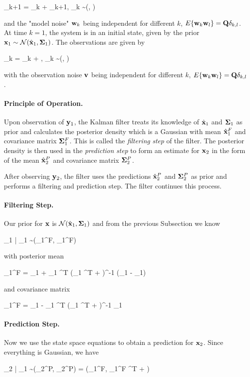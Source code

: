 \bee
\xbf_{k+1} = \Abf \xbf_k + \wbf_{k+1}, \quad \wbf_k \sim \Nc(\zerobf, \Qbf)
\eee

and the "model noise" $\mathbf{w}_k$ being independent for different $k$, $E\{\mathbf{w}_k \mathbf{w}_l\} = \mathbf{Q} \delta_{k,l}$. At time $k=1$, the system is in an initial state, given by the prior $\mathbf{x}_1 \sim \mathcal{N}(\hat {\mathbf{x}}_1, \mathbf{\Sigma}_1)$. The observations are given by

\bee
\ybf_k = \Gbf \xbf_k + \vbf, \quad \vbf_k \sim \Nc(\zerobf, \Rbf)
\eee

with the observation noise $\mathbf{v}$ being independent for different $k$, $E\{\mathbf{w}_k \mathbf{w}_l\} = \mathbf{Q} \delta_{k,l}$.

\paragraph{Principle of Operation.} Upon observation of $\mathbf{y}_1$, the Kalman filter treats its knowledge of $\hat {\mathbf{x}}_1$ and $\mathbf{\Sigma}_1$ as prior and calculates the posterior density which is a Gaussian with mean $\hat{\mathbf{x}}_1^F$ and covariance matrix $\mathbf{\Sigma}_1^F$. This is called the \emph{filtering step} of the filter. The posterior density is then used in the \emph{prediction step} to form an estimate for $\mathbf{x}_2$ in the form of the mean $\hat{\mathbf{x}}_2^P$ and covariance matrix $\mathbf{\Sigma}_2^P$.

After observing $\mathbf{y}_2$, the filter uses the predictions $\hat{\mathbf{x}}_2^P$ and $\mathbf{\Sigma}_2^P$ as prior and performs a filtering and prediction step. The filter continues this process.

\paragraph{Filtering Step.} Our prior for $\mathbf{x}$ is $\mathcal{N}(\hat{\mathbf{x}}_1, \mathbf{\Sigma}_1)$ and from the previous Subsection we know

\bee
\xbf_1 | \ybf_1 \sim \Nc(\xbf_1^F, \Sigmabf_1^F)
\eee

with posterior mean

\bee
\xbf_1^F = \hat\xbf_1 + \Sigmabf_1 \Gbf^T (\Gbf \Sigmabf_1 \Gbf^T + \Rbf)^{-1} (\ybf_1 - \Gbf \hat\xbf_1)
\eee

and covariance matrix

\bee
\Sigmabf_1^F = \Sigmabf_1 - \Sigmabf_1 \Gbf^T (\Gbf \Sigmabf_1 \Gbf^T + \Rbf)^{-1} \Gbf \Sigmabf_1
\eee

\paragraph{Prediction Step.} Now we use the state space equations to obtain a prediction for $\mathbf{x}_2$. Since everything is Gaussian, we have

\bee
\xbf_2 | \ybf_1 \sim \Nc(\hat\xbf_2^P, \Sigmabf_2^P) = \Nc(\Abf \xbf_1^F, \Abf \Sigmabf_1^F \Abf^T + \Qbf)
\eee


